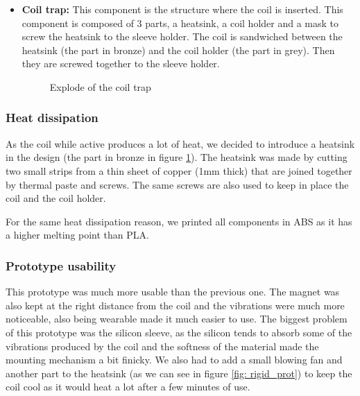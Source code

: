 \begin{itemize}
    \item \textbf{Coil trap: } This component is the structure where the coil is inserted. This component is composed of 3 parts, a heatsink, a coil holder and a mask to screw the heatsink to the sleeve holder.
    The coil is sandwiched between the heatsink (the part in bronze) and the coil holder (the part in grey). Then they are screwed together to the sleeve holder.
    \begin{figure}
        \centering
        \caption{Explode of the coil trap}
        \label{fig: coil_trap}
    \end{figure}
    
\end{itemize}

\subsubsection{Heat dissipation}
As the coil while active produces a lot of heat, we decided to introduce a heatsink in the design (the part in bronze in figure \ref{fig: coil_trap}).
The heatsink was made by cutting two small strips from a thin sheet of copper (1mm thick) that are joined together by thermal paste and screws.
The same screws are also used to keep in place the coil and the coil holder.

For the same heat dissipation reason, we printed all components in ABS as it has a higher melting point than PLA.

\subsubsection{Prototype usability}
This prototype was much more usable than the previous one.
The magnet was also kept at the right distance from the coil and the vibrations were much more noticeable, also being wearable made it much easier to use.
The biggest problem of this prototype was the silicon sleeve, as the silicon tends to absorb some of the vibrations produced by the coil and the softness of the material made the mounting mechanism a bit finicky.
We also had to add a small blowing fan and another part to the heatsink (as we can see in figure \ref{fig: rigid_prot}) to keep the coil cool as it would heat a lot after a few minutes of use.

